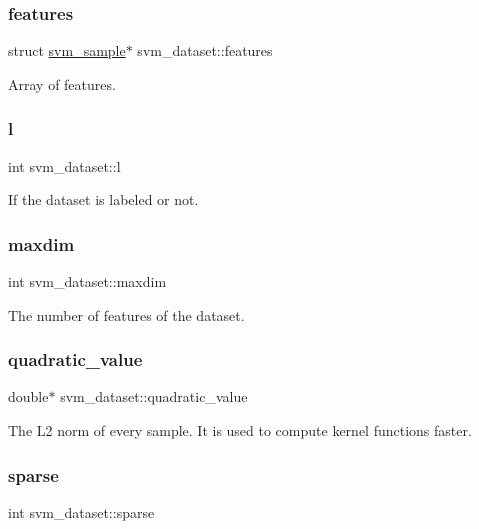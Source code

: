 \subsubsection{\texorpdfstring{features}{features}}
{\ttfamily struct \hyperlink{structsvm__sample}{svm\+\_\+sample}$\ast$ svm\+\_\+dataset\+::features}

Array of features. \hypertarget{structsvm__dataset_a899bdc43cdfb5e7063e8d7d1787357b4}{}\label{structsvm__dataset_a899bdc43cdfb5e7063e8d7d1787357b4} 
\subsubsection{\texorpdfstring{l}{l}}
{\ttfamily int svm\+\_\+dataset\+::l}

If the dataset is labeled or not. \hypertarget{structsvm__dataset_aec1d1ee62ef8204fe90d8c6b7a647177}{}\label{structsvm__dataset_aec1d1ee62ef8204fe90d8c6b7a647177} 
\subsubsection{\texorpdfstring{maxdim}{maxdim}}
{\ttfamily int svm\+\_\+dataset\+::maxdim}

The number of features of the dataset. \hypertarget{structsvm__dataset_a4b1ff8b06358c73f6b55ecae7516d01e}{}\label{structsvm__dataset_a4b1ff8b06358c73f6b55ecae7516d01e} 
\subsubsection{\texorpdfstring{quadratic\+\_\+value}{quadratic\_value}}
{\ttfamily double$\ast$ svm\+\_\+dataset\+::quadratic\+\_\+value}

The L2 norm of every sample. It is used to compute kernel functions faster. \hypertarget{structsvm__dataset_a58e8012a38ef5ea1c642db1b8c06b8bc}{}\label{structsvm__dataset_a58e8012a38ef5ea1c642db1b8c06b8bc} 
\subsubsection{\texorpdfstring{sparse}{sparse}}
{\ttfamily int svm\+\_\+dataset\+::sparse}

